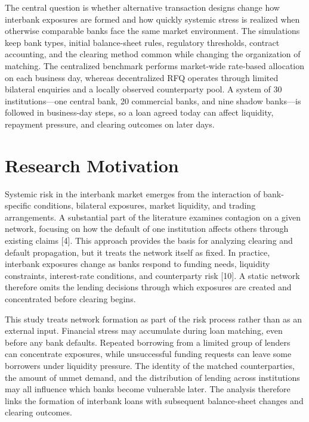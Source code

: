 The central question is whether alternative transaction designs change
how interbank exposures are formed and how quickly systemic stress is
realized when otherwise comparable banks face the same market
environment. The simulations keep bank types, initial balance-sheet
rules, regulatory thresholds, contract accounting, and the clearing
method common while changing the organization of matching. The
centralized benchmark performs market-wide rate-based allocation on each
business day, whereas decentralized RFQ operates through limited bilateral
enquiries and a locally observed counterparty pool. A system of 30
institutions---one central bank, 20 commercial banks, and nine shadow
banks---is followed in business-day steps, so a loan agreed today can
affect liquidity, repayment pressure, and clearing outcomes on later
days.

\section{Research Motivation}

Systemic risk in the interbank market emerges from the interaction of
bank-specific conditions, bilateral exposures, market liquidity, and
trading arrangements. A substantial part of the literature examines
contagion on a given network, focusing on how the default of one
institution affects others through existing claims {[}4{]}. This approach
provides the basis for analyzing clearing and default propagation, but
it treats the network itself as fixed. In practice, interbank exposures
change as banks respond to funding needs, liquidity constraints,
interest-rate conditions, and counterparty risk {[}10{]}. A static
network therefore omits the lending decisions through which exposures
are created and concentrated before clearing begins.

This study treats network formation as part of the risk process rather
than as an external input. Financial stress may accumulate during loan
matching, even before any bank defaults. Repeated borrowing from a
limited group of lenders can concentrate exposures, while unsuccessful
funding requests can leave some borrowers under liquidity pressure. The
identity of the matched counterparties, the amount of unmet demand, and
the distribution of lending across institutions may all influence which
banks become vulnerable later. The analysis therefore links the
formation of interbank loans with subsequent balance-sheet changes and
clearing outcomes.

